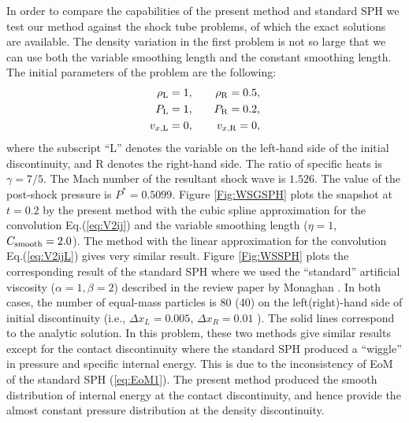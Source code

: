 \documentclass{cjour}
\begin{document}
\begin{article}
In order to compare the capabilities of the present method 
and standard SPH 
we test our method against the shock tube problems, 
of which the exact solutions are available. 
The density variation in the first problem 
is not so large that we can use both 
the variable smoothing length and 
the constant smoothing length. 
The initial parameters of the problem are the following:
\begin{eqnarray}
       \rho_{\rm L}  = 1 & , ~~~& \rho_{\rm R} = 0.5  , \nonumber \\
       P_{\rm L}     = 1 & , ~~~& P_{\rm R}    = 0.2    , \nonumber \\
       v_{x,{\rm L}} = 0 & , ~~~& v_{x,{\rm R}} = 0      ,
\end{eqnarray}
where the subscript ``L'' denotes the variable on the left-hand side
of the initial discontinuity, and R denotes the right-hand side.
The ratio of specific heats is $\gamma = 7/5$.  
The Mach number of the resultant shock wave is $1.526$.
The value of the post-shock pressure is $P^*=0.5099$. 
Figure \ref{Fig:WSGSPH} plots the snapshot at $t=0.2$ 
by the present method with 
the cubic spline approximation for the convolution Eq.(\ref{eq:V2ij}) 
and the variable smoothing length ($\eta=1$, $C_{\rm smooth}=2.0$).
The method with the linear approximation for the convolution 
Eq.(\ref{eq:V2ijL}) gives very similar result. 
Figure \ref{Fig:WSSPH} plots the corresponding result of 
the standard SPH 
where we used the ``standard'' artificial viscosity 
($\alpha=1,\beta=2$) described in 
the review paper by Monaghan \cite{Monaghan:ARAA}.  
In both cases, the number of equal-mass particles
is 80 (40) on the left(right)-hand side of initial discontinuity 
(i.e., $\Delta x_L=0.005$, $\Delta x_R=0.01$ ). 
The solid lines correspond to the analytic solution.
In this problem, these two methods give similar results 
except for the contact discontinuity
where the standard SPH produced a ``wiggle'' in pressure and 
specific internal energy.  
This is due to the inconsistency of EoM of the standard SPH 
(\ref{eq:EoM1}). 
The present method produced the smooth distribution of internal energy 
at the contact discontinuity, and hence provide the almost constant 
pressure distribution at the density discontinuity. 


\end{article}
\end{document}
